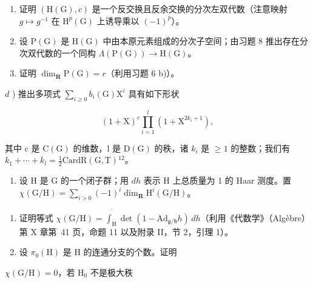 \begin{enumerate}
\begin{enumerate}
\def\labelenumi{\alph{enumi})}
\item
  证明 \((\mathrm{H}(\mathrm{G}), c)\) 是一个反交换且反余交换的分次左双代数（注意映射 \(g \mapsto g^{-1}\) 在 \(\mathrm{H}^{p}(\mathrm{G})\) 上诱导乘以 \((-1)^{p}\)）。
\item
  设 \(\mathrm{P}(\mathrm{G})\) 是 \(\mathrm{H}(\mathrm{G})\) 中由本原元素组成的分次子空间；由习题 8 推出存在分次双代数的一个同构 \(\Lambda(\mathrm{P}(\mathrm{G})) \to \mathrm{H}(\mathrm{G})\)。
\item
  证明 \(\dim_{\mathbf{R}}\mathrm{P}(\mathrm{G})=r\)（利用习题 6 b)）。
\end{enumerate}

\(d\) ) 推出多项式 \(\sum_{i\geq 0}b_i(\mathrm{G})\mathrm{X}^i\) 具有如下形状

\[
(1 + \mathrm{X}) ^ {c} \prod_ {i = 1} ^ {l} (1 + \mathrm{X} ^ {2 k _ {i} + 1}),
\]

其中 c 是 \(\mathrm{C}(\mathrm{G})\) 的维数，l 是 \(\mathrm{D}(\mathrm{G})\) 的秩，诸 \(k_{i}\) 是 \(\geq 1\) 的整数；我们有 \(k_{1} + \cdots + k_{l} = \frac{1}{2}\mathrm{Card}\mathrm{R}(\mathrm{G},\mathrm{T})\)\(^{12}\)。


\begin{enumerate}
\def\labelenumi{\arabic{enumi})}
\setcounter{enumi}{9}
\tightlist
\item
  设 \(\mathrm{H}\) 是 \(\mathrm{G}\) 的一个闭子群；用 \(dh\) 表示 \(\mathrm{H}\) 上总质量为 1 的 Haar 测度。置 \(\chi(\mathrm{G} / \mathrm{H}) = \sum_{i > 0} (-1)^i \dim_{\mathbf{R}} \mathrm{H}^i (\mathrm{G} / \mathrm{H})\)。
\end{enumerate}

\begin{enumerate}
\def\labelenumi{\alph{enumi})}
\item
  证明等式 \(\chi(\mathrm{G}/\mathrm{H})=\overline{\int_{\mathrm{H}}}\det(1-\mathrm{Ad}_{\mathfrak{g}/\mathfrak{h}}h)\,dh\)（利用《代数学》（Algèbre）第 X 章第~41 页，命题 11 以及附录 II，节 2，引理 1）。
\item
  设 \(\pi_{0}(\mathrm{H})\) 是 H 的连通分支的个数。证明
\end{enumerate}

\(\chi (\mathrm{G / H}) = 0\)，若 \(\mathrm{H_0}\) 不是极大秩


\end{enumerate}
